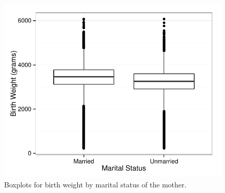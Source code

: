 \documentclass[a4paper, 12pt]{article}
\begin{document}
\begin{itemize}
\begin{figure}[htbp]
\begin{center}
\includegraphics{img/bw-mar.pdf}
\caption{Boxplots for birth weight by marital status of the mother.}
\label{fig:bwMar}
\end{center}
\end{figure}


\end{itemize}
\end{document}

